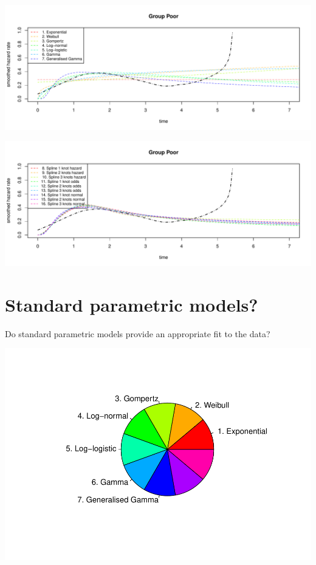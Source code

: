 \documentclass[]{article}
\begin{document}
\begin{flushleft}\includegraphics[height=0.29\textheight]{Images/plot_haz_pred-5} \end{flushleft}

\begin{flushleft}\includegraphics[height=0.29\textheight]{Images/plot_haz_pred-6} \end{flushleft}

\newpage

\section{Standard parametric models?}\label{standard-parametric-models}

Do standard parametric models provide an appropriate fit to the data?

\begin{flushleft}\includegraphics{Images/plot_parametric-1} \end{flushleft}
\end{document}
